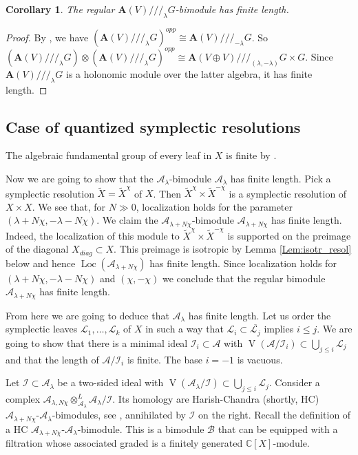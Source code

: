 \documentclass[12pt]{amsart}
\newcommand{\A}{\mathcal{A}}
\newcommand{\I}{\mathcal{I}}
\newcommand{\VA}{\operatorname{V}}
\newcommand{\Weyl}{\mathbf{A}}
\newcommand{\B}{\mathcal{B}}
\newcommand{\C}{\mathbb{C}}
\newcommand{\red}{/\!/\!/}
\newtheorem{Cor}[Thm]{Corollary}
\theoremstyle{definition}
\begin{document}
\begin{Cor}\label{Cor:red_fin_length}
The regular $\Weyl(V)\red_\lambda G$-bimodule has finite length.
\end{Cor}
\begin{proof}
By \cite[Lemma 3.14]{BPW}, we have $(\Weyl(V)\red_\lambda G)^{opp}\cong \Weyl(V)\red_{-\lambda} G$.
So $(\Weyl(V)\red_\lambda G)\otimes (\Weyl(V)\red_\lambda G)^{opp}\cong \Weyl(V\oplus V)\red_{(\lambda,-\lambda)}G\times G$. Since $\Weyl(V)\red_\lambda G$ is a holonomic module over the latter algebra, it has finite length.
\end{proof}

\subsection{Case of quantized symplectic resolutions}
The algebraic fundamental group of every leaf in $X$ is finite by \cite{Namikawa_fund}.

Now we are going to show that the $\A_\lambda$-bimodule $\A_\lambda$ has finite length.
Pick a symplectic resolution $\tilde{X}=\tilde{X}^{\chi}$ of $X$. Then $\tilde{X}^\chi\times
\tilde{X}^{-\chi}$ is a symplectic resolution of $X\times X$. We see that, for $N\gg 0$,
localization holds for the parameter $(\lambda+N\chi, -\lambda-N\chi)$. We claim the
$\A_{\lambda+N\chi}$-bimodule $\A_{\lambda+N\chi}$ has finite length. Indeed, the localization
of this module to $\tilde{X}^{\chi}\times \tilde{X}^{-\chi}$ is supported on the preimage of the diagonal
$X_{diag}\subset X$. This preimage is isotropic by Lemma \ref{Lem:isotr_resol} below
and hence $\operatorname{Loc}(\A_{\lambda+N\chi})$ has finite length. Since localization
holds for $(\lambda+N\chi, -\lambda-N\chi)$ and $(\chi,-\chi)$ we conclude that the regular
bimodule $\A_{\lambda+N\chi}$ has finite length.


From here we are going to deduce that $\A_\lambda$ has finite length. Let us order the
symplectic leaves $\mathcal{L}_1,\ldots,\mathcal{L}_k$ of $X$ in such a way that
$\mathcal{L}_i\subset \overline{\mathcal{L}_j}$ implies $i\leqslant j$. We are going to
show that there is a minimal ideal $\I_i\subset \A$ with $\VA(\A/\I_i)\subset \bigcup_{j\leqslant i}
\mathcal{L}_j$ and that the length of $\A/\I_i$ is finite. The base $i=-1$ is vacuous.

Let $\I\subset \A_\lambda$ be a two-sided ideal with $\VA(\A_\lambda/\I)\subset\bigcup_{j\leqslant i}\mathcal{L}_j$.
Consider a complex $\A_{\lambda,N\chi}\otimes^L_{\A_\lambda}\A_\lambda/\I$. Its homology are Harish-Chandra (shortly, HC)
$\A_{\lambda+N\chi}$-$\A_\lambda$-bimodules, see \cite[Section 6.1]{BPW}, annihilated by $\I$ on the right.
Recall the definition of a HC $\A_{\lambda+N\chi}$-$\A_\lambda$-bimodule. This is a bimodule $\B$
that can be equipped with a filtration whose associated graded is a finitely generated $\C[X]$-module.
\end{document}
